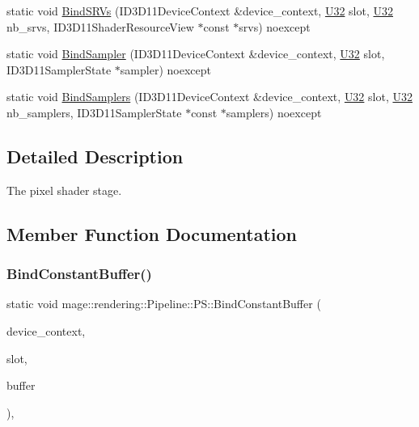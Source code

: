 \begin{DoxyCompactItemize}
\item 
static void \mbox{\hyperlink{structmage_1_1rendering_1_1_pipeline_1_1_p_s_a68416782f212a22b5bb3ef7f8499b0b5}{Bind\+S\+R\+Vs}} (I\+D3\+D11\+Device\+Context \&device\+\_\+context, \mbox{\hyperlink{namespacemage_aa5d6eaabaac3cdd01873d6a3d27e90f3}{U32}} slot, \mbox{\hyperlink{namespacemage_aa5d6eaabaac3cdd01873d6a3d27e90f3}{U32}} nb\+\_\+srvs, I\+D3\+D11\+Shader\+Resource\+View $\ast$const $\ast$srvs) noexcept
\item 
static void \mbox{\hyperlink{structmage_1_1rendering_1_1_pipeline_1_1_p_s_ac611cd5f91d4a3fc2547b9fa7ea90d86}{Bind\+Sampler}} (I\+D3\+D11\+Device\+Context \&device\+\_\+context, \mbox{\hyperlink{namespacemage_aa5d6eaabaac3cdd01873d6a3d27e90f3}{U32}} slot, I\+D3\+D11\+Sampler\+State $\ast$sampler) noexcept
\item 
static void \mbox{\hyperlink{structmage_1_1rendering_1_1_pipeline_1_1_p_s_a1dbc338e08dbda19fe77f441de83b080}{Bind\+Samplers}} (I\+D3\+D11\+Device\+Context \&device\+\_\+context, \mbox{\hyperlink{namespacemage_aa5d6eaabaac3cdd01873d6a3d27e90f3}{U32}} slot, \mbox{\hyperlink{namespacemage_aa5d6eaabaac3cdd01873d6a3d27e90f3}{U32}} nb\+\_\+samplers, I\+D3\+D11\+Sampler\+State $\ast$const $\ast$samplers) noexcept
\end{DoxyCompactItemize}


\subsection{Detailed Description}
The pixel shader stage. 

\subsection{Member Function Documentation}
\mbox{\label{structmage_1_1rendering_1_1_pipeline_1_1_p_s_a271bf03f9d800f30ba8b8224c5eca21f}} 
\subsubsection{\texorpdfstring{Bind\+Constant\+Buffer()}{BindConstantBuffer()}}
{\footnotesize\ttfamily static void mage\+::rendering\+::\+Pipeline\+::\+P\+S\+::\+Bind\+Constant\+Buffer (\begin{DoxyParamCaption}\item[{I\+D3\+D11\+Device\+Context \&}]{device\+\_\+context,  }\item[{\mbox{\hyperlink{namespacemage_aa5d6eaabaac3cdd01873d6a3d27e90f3}{U32}}}]{slot,  }\item[{I\+D3\+D11\+Buffer $\ast$}]{buffer }\end{DoxyParamCaption})\hspace{0.3cm}{\ttfamily [static]}, {\ttfamily [noexcept]}}

